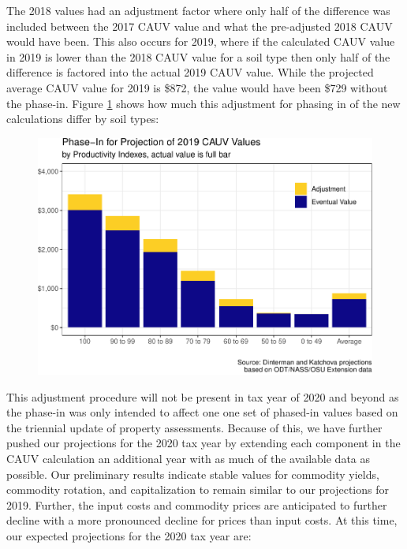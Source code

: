 \documentclass[]{article}
\begin{document}
The 2018 values had an adjustment factor where only half of the
difference was included between the 2017 CAUV value and what the
pre-adjusted 2018 CAUV would have been. This also occurs for 2019, where
if the calculated CAUV value in 2019 is lower than the 2018 CAUV value
for a soil type then only half of the difference is factored into the
actual 2019 CAUV value. While the projected average CAUV value for 2019
is \$872, the value would have been \$729 without the phase-in. Figure
\ref{fig:exp-2019} shows how much this adjustment for phasing in of the
new calculations differ by soil types:

\begin{figure}[H]
\includegraphics[width=1\linewidth]{4-projections-2019-2020_files/figure-latex/exp-2019-1} \caption{\label{fig:exp-2019}}\label{fig:exp-2019}
\end{figure}

This adjustment procedure will not be present in tax year of 2020 and
beyond as the phase-in was only intended to affect one one set of
phased-in values based on the triennial update of property assessments.
Because of this, we have further pushed our projections for the 2020 tax
year by extending each component in the CAUV calculation an additional
year with as much of the available data as possible. Our preliminary
results indicate stable values for commodity yields, commodity rotation,
and capitalization to remain similar to our projections for 2019.
Further, the input costs and commodity prices are anticipated to further
decline with a more pronounced decline for prices than input costs. At
this time, our expected projections for the 2020 tax year are:
\end{document}
